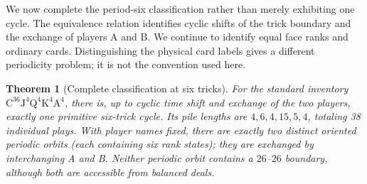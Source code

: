 \documentclass[11pt]{article}
\newtheorem{theorem}{Theorem}
\newcommand{\CC}{\mathrm C}
\newcommand{\JJ}{\mathrm J}
\newcommand{\QQ}{\mathrm Q}
\newcommand{\KK}{\mathrm K}
\renewcommand{\AA}{\mathrm A}
\begin{document}
We now complete the period-six classification rather than merely exhibiting
one cycle. The equivalence relation identifies cyclic shifts of the trick
boundary and the exchange of players A and B. We continue to identify equal
face ranks and ordinary cards. Distinguishing the physical card labels gives
a different periodicity problem; it is not the convention used here.

\begin{theorem}[Complete classification at six tricks]\label{thm:six}
For the standard inventory $\CC^{36}\JJ^4\QQ^4\KK^4\AA^4$,
there is, up to cyclic time shift and exchange of the two players,
\emph{exactly one} primitive six-trick cycle. Its pile lengths are
$4,6,4,15,5,4$, totaling 38 individual plays. With player names fixed,
there are exactly two distinct oriented periodic orbits (each containing
six rank states); they are exchanged by interchanging A and B. Neither
periodic orbit contains a $26$--$26$ boundary, although both are accessible
from balanced deals.
\end{theorem}
\end{document}
